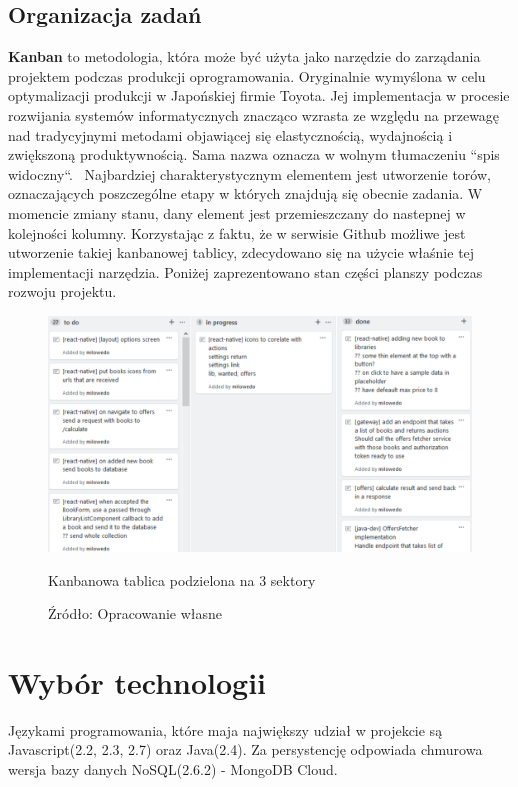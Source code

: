 \subsection{Organizacja zadań}
\textbf{Kanban} to metodologia, która może być użyta jako narzędzie do zarządania projektem podczas produkcji oprogramowania. Oryginalnie wymyślona w celu optymalizacji produkcji w Japońskiej firmie Toyota. Jej implementacja w procesie rozwijania systemów informatycznych znacząco wzrasta ze względu na przewagę nad tradycyjnymi metodami objawiącej się elastycznością, wydajnością i zwiększoną produktywnością. Sama nazwa oznacza w wolnym tłumaczeniu ``spis widoczny``.~\cite{kanban} Najbardziej charakterystycznym elementem jest utworzenie torów, oznaczających poszczególne etapy w których znajdują się obecnie zadania. W momencie zmiany stanu, dany element jest przemieszczany do nastepnej w kolejności kolumny.
Korzystając z faktu, że w serwisie Github możliwe jest utworzenie takiej kanbanowej tablicy, zdecydowano się na użycie właśnie tej implementacji narzędzia. Poniżej zaprezentowano stan części planszy podczas rozwoju projektu.
\begin{figure}[H]
	\centering
	\includegraphics[width=\linewidth]{kanban.pdf}
	\caption{Kanbanowa tablica podzielona na 3 sektory}
	\caption*{Źródło: {Opracowanie własne}}
\end{figure}

\newpage
\section{Wybór technologii}
Językami programowania, które maja największy udział w projekcie są Javascript(2.2, 2.3, 2.7) oraz Java(2.4). Za persystencję odpowiada chmurowa wersja bazy danych NoSQL(2.6.2) - MongoDB Cloud.


